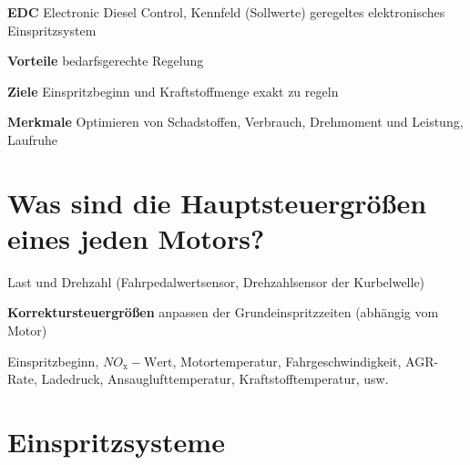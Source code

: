 \textbf{EDC} Electronic Diesel Control, Kennfeld (Sollwerte) geregeltes
elektronisches Einspritzsystem

\textbf{Vorteile} bedarfsgerechte Regelung

\textbf{Ziele} Einspritzbeginn und Kraftstoffmenge exakt zu regeln

\textbf{Merkmale} Optimieren von Schadstoffen, Verbrauch, Drehmoment und
Leistung, Laufruhe

\section{Was sind die Hauptsteuergrößen eines jeden
Motors?}\label{was-sind-die-hauptsteuergroessen-eines-jeden-motors}

Last und Drehzahl (Fahrpedalwertsensor, Drehzahlsensor der Kurbelwelle)

\textbf{Korrektursteuergrößen} anpassen der Grundeinspritzzeiten
(abhängig vom Motor)

Einspritzbeginn, $NO_\text{x}-\text{Wert}$, Motortemperatur,
Fahrgeschwindigkeit, AGR-Rate, Ladedruck, Ansauglufttemperatur,
Kraftstofftemperatur, usw.

\section{Einspritzsysteme}\label{einspritzsysteme}

